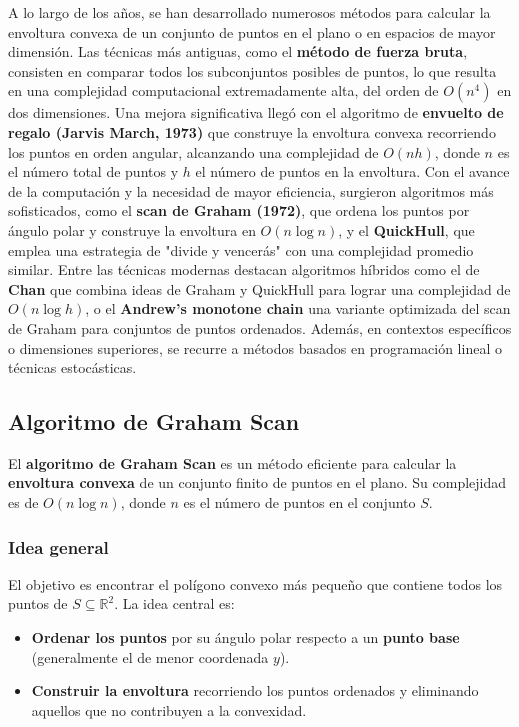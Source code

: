\documentclass[12pt]{book}
\theoremstyle{definition}
\theoremstyle{plain}
\theoremstyle{remark}
\begin{document}
A lo largo de los años, se han desarrollado numerosos métodos para calcular la envoltura convexa de un conjunto de puntos en el plano o en espacios de mayor dimensión. Las técnicas más antiguas, como el \textbf{método de fuerza bruta}, consisten en comparar todos los subconjuntos posibles de puntos, lo que resulta en una complejidad computacional extremadamente alta, del orden de \( O(n^4) \) en dos dimensiones. Una mejora significativa llegó con el algoritmo de \textbf{envuelto de regalo (Jarvis March, 1973)} %
que construye la envoltura convexa recorriendo los puntos en orden angular, alcanzando una complejidad de \( O(nh) \), donde \( n \) es el número total de puntos y \( h \) el número de puntos en la envoltura. Con el avance de la computación y la necesidad de mayor eficiencia, surgieron algoritmos más sofisticados, como el \textbf{scan de Graham (1972)}, %
que ordena los puntos por ángulo polar y construye la envoltura en \( O(n \log n) \), y el \textbf{QuickHull}, %
que emplea una estrategia de "divide y vencerás" con una complejidad promedio similar. Entre las técnicas modernas destacan algoritmos híbridos como el de \textbf{Chan} %
que combina ideas de Graham y QuickHull para lograr una complejidad de \( O(n \log h) \), o el \textbf{Andrew's monotone chain} %
una variante optimizada del scan de Graham para conjuntos de puntos ordenados. Además, en contextos específicos o dimensiones superiores, se recurre a métodos basados en programación lineal o técnicas estocásticas. %

\subsection{Algoritmo de Graham Scan} %
\label{subsec:graham}

El \textbf{algoritmo de Graham Scan} %
es un método eficiente para calcular la \textbf{envoltura convexa} de un conjunto finito de puntos en el plano. Su complejidad es de \( O(n \log n) \), donde \( n \) es el número de puntos en el conjunto \( S \).

\subsubsection{Idea general}
El objetivo es encontrar el polígono convexo más pequeño que contiene todos los puntos de \( S \subseteq \mathbb{R}^2 \). La idea central es:
\begin{itemize}
    \item \textbf{Ordenar los puntos} por su ángulo polar respecto a un \textbf{punto base} (generalmente el de menor coordenada \( y \)).
    \item \textbf{Construir la envoltura} recorriendo los puntos ordenados y eliminando aquellos que no contribuyen a la convexidad.
\end{itemize}
\end{document}
